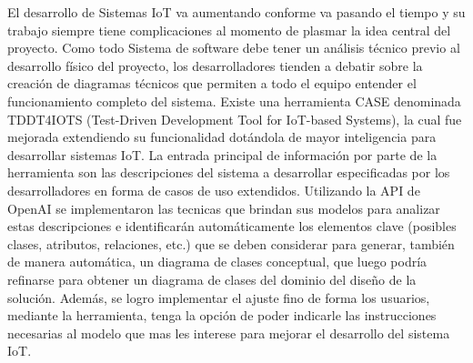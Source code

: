 
El desarrollo de Sistemas IoT va aumentando conforme va pasando el tiempo y su trabajo siempre tiene complicaciones al momento de plasmar la idea central del proyecto. Como todo Sistema de software debe tener un análisis técnico previo al desarrollo físico del proyecto, los desarrolladores tienden a debatir sobre la creación de diagramas técnicos que permiten a todo el equipo entender el funcionamiento completo del sistema. Existe una herramienta CASE denominada TDDT4IOTS (Test-Driven Development Tool for IoT-based Systems), la cual fue mejorada extendiendo su funcionalidad dotándola de mayor inteligencia para desarrollar sistemas IoT. La entrada principal de información por parte de la herramienta son las descripciones del sistema a desarrollar especificadas por los desarrolladores en forma de casos de uso extendidos. Utilizando la API de OpenAI se implementaron las tecnicas que brindan sus modelos para analizar estas descripciones e identificarán automáticamente los elementos clave (posibles clases, atributos, relaciones, etc.) que se deben considerar para generar, también de manera automática, un diagrama de clases conceptual, que luego podría refinarse para obtener un diagrama de clases del dominio del diseño de la solución. Además, se logro implementar el ajuste fino de forma los usuarios, mediante la herramienta, tenga la opción de poder indicarle las instrucciones necesarias al modelo que mas les interese para mejorar el desarrollo del sistema IoT.